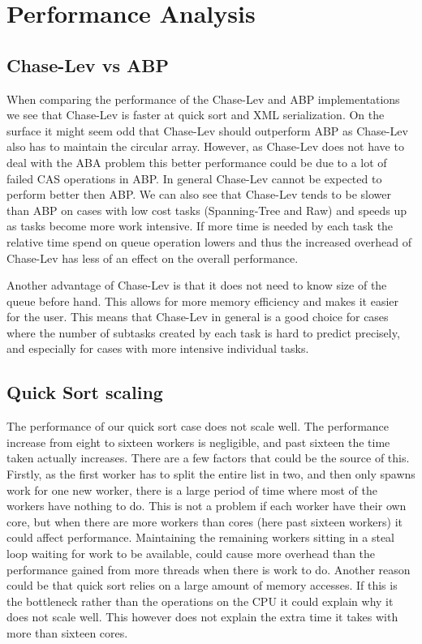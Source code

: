 \section{Performance Analysis}
\label{sec:performance_analysis}
\subsection{Chase-Lev vs ABP}
When comparing the performance of the Chase-Lev and ABP implementations we see that Chase-Lev is faster at quick sort and XML serialization. On the surface it might seem odd that Chase-Lev should outperform ABP as Chase-Lev also has to maintain the circular array. However, as Chase-Lev does not have to deal with the ABA problem this better performance could be due to a lot of failed CAS operations in ABP\@. In general Chase-Lev cannot be expected to perform better then ABP\@. We can also see that Chase-Lev tends to be slower than ABP on cases with low cost tasks (Spanning-Tree and Raw) and speeds up as tasks become more work intensive. If more time is needed by each task the relative time spend on queue operation lowers and thus the increased overhead of Chase-Lev has less of an effect on the overall performance.

Another advantage of Chase-Lev is that it does not need to know size of the queue before hand. This allows for more memory efficiency and makes it easier for the user. This means that Chase-Lev in general is a good choice for cases where the number of subtasks created by each task is hard to predict precisely, and especially for cases with more intensive individual tasks.

\subsection{Quick Sort scaling}
The performance of our quick sort case does not scale well. The performance increase from eight to sixteen workers is negligible, and past sixteen the time taken actually increases. There are a few factors that could be the source of this. Firstly, as the first worker has to split the entire list in two, and then only spawns work for one new worker, there is a large period of time where most of the workers have nothing to do. This is not a problem if each worker have their own core, but when there are more workers than cores (here past sixteen workers) it could affect performance. Maintaining the remaining workers sitting in a steal loop waiting for work to be available, could cause more overhead than the performance gained from more threads when there is work to do. Another reason could be that quick sort relies on a large amount of memory accesses. If this is the bottleneck rather than the operations on the CPU it could explain why it does not scale well. This however does not explain the extra time it takes with more than sixteen cores.

